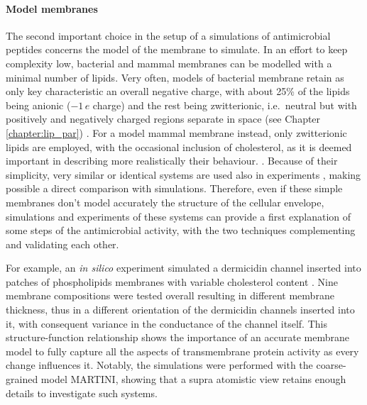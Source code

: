 \paragraph{Model membranes} The second important choice in the setup of a simulations of antimicrobial peptides concerns the model of the membrane to simulate. In an effort to keep complexity low, bacterial and mammal membranes can be modelled with a minimal number of lipids.
%
Very often, models of bacterial membrane retain as only key characteristic an overall negative charge, with about 25\% of the lipids being anionic ($-1\,e$ charge) and the rest being zwitterionic, i.e.\ neutral but with positively and negatively charged regions separate in space (see Chapter \ref{chapter:lip_par}) \citep{Lipkin2017,Wang2012,Zhao2018,Chen2019}.
For a model mammal membrane instead, only zwitterionic lipids are employed, with the occasional inclusion of cholesterol, as it is deemed important in describing more realistically their behaviour. \citep{Lipkin2017,Wang2012,Zhao2018,Chen2019,Risselada2008}.
Because of their simplicity, very similar or identical systems are used also in experiments \citep{Castelletto2016,Tang2009,Glukhov2005}, making possible a direct comparison with simulations.
Therefore, even if these simple membranes don't model accurately the structure of the cellular envelope, simulations and experiments of these systems can provide a first explanation of some steps of the antimicrobial activity, with the two techniques complementing and validating each other.

For example, an \emph{in silico} experiment simulated a dermicidin channel inserted into patches of phospholipids membranes with variable cholesterol content \citep{Song2019}. Nine membrane compositions were tested overall resulting in different membrane thickness, thus in a different orientation of the dermicidin channels inserted into it, with consequent variance in the conductance of the channel itself. This structure-function relationship shows the importance of an accurate membrane model to fully capture all the aspects of transmembrane protein activity as every change influences it. Notably, the simulations were performed with the coarse-grained model MARTINI, showing that a supra atomistic view retains enough details to investigate such systems.

